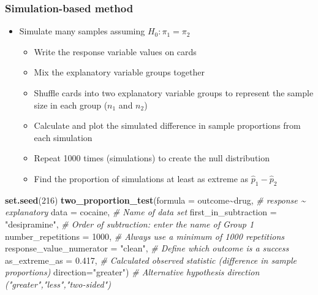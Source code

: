 \documentclass[
]{report}
\newenvironment{Shaded}{\begin{snugshade}}{\end{snugshade}}
\newcommand{\AttributeTok}[1]{\textcolor[rgb]{0.13,0.29,0.53}{#1}}
\newcommand{\CommentTok}[1]{\textcolor[rgb]{0.56,0.35,0.01}{\textit{#1}}}
\newcommand{\DecValTok}[1]{\textcolor[rgb]{0.00,0.00,0.81}{#1}}
\newcommand{\FloatTok}[1]{\textcolor[rgb]{0.00,0.00,0.81}{#1}}
\newcommand{\FunctionTok}[1]{\textcolor[rgb]{0.13,0.29,0.53}{\textbf{#1}}}
\newcommand{\NormalTok}[1]{#1}
\newcommand{\SpecialCharTok}[1]{\textcolor[rgb]{0.81,0.36,0.00}{\textbf{#1}}}
\newcommand{\StringTok}[1]{\textcolor[rgb]{0.31,0.60,0.02}{#1}}
\begin{document}
\subsubsection*{Simulation-based method}\label{simulation-based-method-4}

\begin{itemize}
\item
  Simulate many samples assuming \(H_0: \pi_1 = \pi_2\)

  \begin{itemize}
  \item
    Write the response variable values on cards
  \item
    Mix the explanatory variable groups together
  \item
    Shuffle cards into two explanatory variable groups to represent the sample size in each group (\(n_1\) and \(n_2\))
  \item
    Calculate and plot the simulated difference in sample proportions from each simulation
  \item
    Repeat 1000 times (simulations) to create the null distribution
  \item
    Find the proportion of simulations at least as extreme as \(\hat{p}_1 - \hat{p}_2\)
  \end{itemize}
\end{itemize}

\begin{Shaded}
\begin{Highlighting}[]
\FunctionTok{set.seed}\NormalTok{(}\DecValTok{216}\NormalTok{)}
\FunctionTok{two\_proportion\_test}\NormalTok{(}\AttributeTok{formula =}\NormalTok{ outcome}\SpecialCharTok{\textasciitilde{}}\NormalTok{drug, }\CommentTok{\# response \textasciitilde{} explanatory}
    \AttributeTok{data =}\NormalTok{ cocaine, }\CommentTok{\# Name of data set}
    \AttributeTok{first\_in\_subtraction =} \StringTok{"desipramine"}\NormalTok{, }\CommentTok{\# Order of subtraction: enter the name of Group 1}
    \AttributeTok{number\_repetitions =} \DecValTok{1000}\NormalTok{, }\CommentTok{\# Always use a minimum of 1000 repetitions}
    \AttributeTok{response\_value\_numerator =} \StringTok{"clean"}\NormalTok{, }\CommentTok{\# Define which outcome is a success}
    \AttributeTok{as\_extreme\_as =} \FloatTok{0.417}\NormalTok{, }\CommentTok{\# Calculated observed statistic (difference in sample proportions)}
    \AttributeTok{direction=}\StringTok{"greater"}\NormalTok{) }\CommentTok{\# Alternative hypothesis direction ("greater","less","two{-}sided")}
\end{Highlighting}
\end{Shaded}
\end{document}
